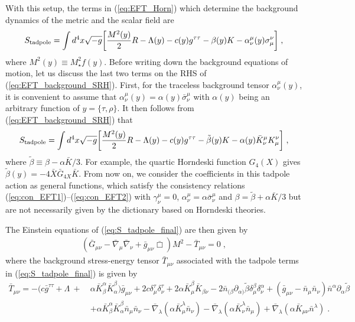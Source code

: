 \documentclass[a4paper,11pt]{article}
\numberwithin{equation}{section}
\begin{document}
With this setup, the terms in (\ref{eq:EFT_Horn}) which determine the background dynamics of the metric and the scalar field are
\begin{align}\label{eq:EFT_background_SRH}
S_{\rm tadpole} = \int d^4x \sqrt{-g} \bigg[\frac{M^2(y)}{2}R - \Lambda(y) - c(y)g^{\tau\tau} - \beta(y) K  - \alpha^\mu_{\nu}(y)\sigma^{\nu}_\mu \bigg] \;,
\end{align}
where $M^2(y) \equiv M^2_\star f(y)$. Before writing down the background equations of motion, let us discuss the last two terms on the RHS of (\ref{eq:EFT_background_SRH}). First, for the traceless background tensor $\alpha^{\mu}_{\nu}(y)$, it is convenient to assume that $\alpha^{\mu}_{\nu}(y) = \alpha(y) \bar{\sigma}^{\mu}_\nu$ with $\alpha(y)$ being an arbitrary function of $y = \{\tau, \rho\}$. It then follows from (\ref{eq:EFT_background_SRH}) that 
\begin{align}\label{eq:S_tadpole_final}
S_{\rm tadpole} = \int d^4x \sqrt{-g} \bigg[\frac{M^2(y)}{2}R - \Lambda(y) - c(y)g^{\tau\tau} - \tilde{\beta}(y) K - \alpha(y)\bar{K}^{\mu}_\nu K^\nu_{\mu}  \bigg] \;,
\end{align}
where $\tilde{\beta} \equiv \beta - \alpha\bar{K}/3$. For example, the quartic Horndeski function $G_4(X)$ gives $\tilde{\beta}(y) = -4\bar{X}\bar{G}_{4X} \bar{K}$. From now on, we consider the coefficients in this tadpole action as general functions, which satisfy the consistency relations (\ref{eq:con_EFT1})--(\ref{eq:con_EFT2}) with $\gamma^{\mu}_{\nu}=0$, $\alpha^{\mu}_{\nu}=\alpha\bar{\sigma}^{\mu}_{\nu}$ and $\beta=\tilde{\beta}+\alpha\bar{K}/3$ but are not necessarily given by the dictionary based on Horndeski theories. 

The Einstein equations of (\ref{eq:S_tadpole_final}) are then given by
\begin{align}\label{eq:eins}
(\bar{G}_{\mu\nu} - \bar{\nabla}_\mu \bar{\nabla}_\nu + \bar{g}_{\mu\nu}\bar{\Box}) M^2 - \bar{T}_{\mu\nu} = 0 \;,
\end{align}
where the background stress-energy tensor $\bar{T}_{\mu\nu}$ associated with the tadpole terms in (\ref{eq:S_tadpole_final}) is given by 
\begin{align}
\bar{T}_{\mu\nu} = -(c \bar{g}^{\tau\tau} + \Lambda \ + \ &\alpha \bar{K}^\alpha_{\beta}\bar{K}^{\beta}_\alpha) \bar{g}_{\mu\nu} + 2 c \delta_\mu^\tau \delta_\nu^\tau + 2 \alpha \bar{K}^\beta_{\mu} \bar{K}_{\beta \nu} - 2 \bar{n}_{(\beta}\partial_{\alpha)}\tilde{\beta} \delta^\beta_{\mu}\delta_\nu^\alpha + (\bar{g}_{\mu\nu} - \bar{n}_\mu \bar{n}_\nu) \bar{n}^\alpha \partial_\alpha \tilde{\beta}  \nonumber \\ 
 &+\alpha \bar{K}^\alpha_{\beta}\bar{K}^\beta_{\alpha} \bar{n}_\mu \bar{n}_\nu - \bar{\nabla}_\lambda (\alpha \bar{K}^\lambda_\mu \bar{n}_\nu) - \bar{\nabla}_\lambda(\alpha \bar{K}^\lambda_\nu \bar{n}_\mu) + \bar{\nabla}_\lambda (\alpha \bar{K}_{\mu\nu} \bar{n}^\lambda) \label{eq:T_munu_EFT} \;.
\end{align}
\end{document}
